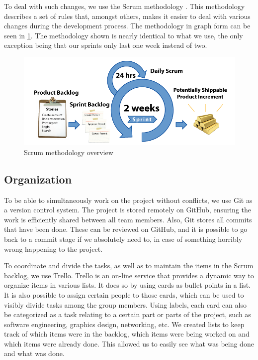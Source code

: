 			To deal with such changes, we use the Scrum methodology \cite{scrum}. This
			methodology describes a set of rules that, amongst others, makes it
			easier to deal with various changes during the development process.
			The methodology
			in graph form can be seen in \ref{fig:scrum}. The methodology
			shown is nearly identical to what we use, the only 
			exception being that our sprints only last one week instead of two.
			
			\begin{figure}
			\centering
			\includegraphics[width=\textwidth]{Scrum}
			\caption{Scrum methodology overview}
			\label{fig:scrum}
			\end{figure}
		
		\subsection{Organization} \label{ssec:organization}
			To be able to simultaneously work on the project without conflicts, we
			use Git as a version control system. The project is stored remotely on
			GitHub, ensuring the work is efficiently shared between all team members.
			Also, Git stores all commits that have been done. These can be reviewed
			on GitHub, and it is possible to go back to a commit stage if we
			absolutely need to, in case of something horribly wrong happening to
			the project.
			
			To coordinate and divide the tasks, as well as to maintain the items in
			the Scrum backlog, we use Trello. Trello is an on-line service that
			provides a dynamic way to organize items in various lists. It does
			so by using cards as bullet points in a list. It is also possible to
			assign certain people to those cards, which can be used to visibly
			divide tasks among the group members. Using labels, each card can also
			be categorized as a task relating to a certain part or parts of the
			project, such as software engineering, graphics design, networking,
			etc. We created lists to keep track of which items were in the backlog, 
			which items were being worked on and which items were already done.
			This allowed us to easily see what was being done and what was done.
			
